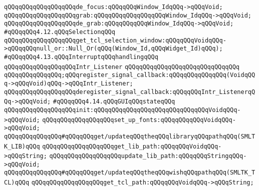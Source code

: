 \verb|qQQqqQQqqQQqqQQqqQQqde_focus:qQQqqQQqWindow_IdqQQq->qQQqVoid;|\newline
\verb|qQQqqQQqqQQqqQQqqQQqgrab:qQQqqQQqqQQqqQQqqQQqWindow_IdqQQq->qQQqVoid;|\newline
\verb|qQQqqQQqqQQqqQQqqQQqde_grab:qQQqqQQqqQQqWindow_IdqQQq->qQQqVoid;|\newline
\newline
\verb|#qQQqqQQq4.12.qQQqSelectionqQQq|\newline
\newline
\verb|qQQqqQQqqQQqqQQqqQQqget_tcl_selection_window:qQQqqQQqVoidqQQq->qQQqqQQqnull_or::Null_Or(qQQq(Window_Id,qQQqWidget_Id)qQQq);|\newline
\newline
\newline
\verb|#qQQqqQQq4.13.qQQqInterruptqQQqhandlingqQQq|\newline
\newline
\verb|qQQqqQQqqQQqqQQqqQQqIntr_Listener|\newline
\verb|qQQqqQQqqQQqqQQqqQQqqQQqqQQqqQQq|\newline
\verb|qQQqqQQqqQQqqQQq;qQQqregister_signal_callback:qQQqqQQqqQQqqQQq(VoidqQQq->qQQqVoid)qQQq->qQQqIntr_Listener;|\newline
\verb|qQQqqQQqqQQqqQQqqQQqderegister_signal_callback:qQQqqQQqIntr_ListenerqQQq->qQQqVoid;|\newline
\newline
\newline
\verb|#qQQqqQQq4.14.qQQqGUIqQQqstateqQQq|\newline
\newline
\verb|qQQqqQQqqQQqqQQqqQQqinit:qQQqqQQqqQQqqQQqqQQqqQQqqQQqqQQqVoidqQQq->qQQqVoid;|\newline
\verb|qQQqqQQqqQQqqQQqqQQqset_up_fonts:qQQqqQQqqQQqVoidqQQq->qQQqVoid;|\newline
\newline
\verb|qQQqqQQqqQQqqQQq#qQQqqQQqget/updateqQQqtheqQQqlibraryqQQqpathqQQq(SMLTK_LIB)qQQq|\newline
\verb|qQQqqQQqqQQqqQQqqQQqget_lib_path:qQQqqQQqVoidqQQq->qQQqString;|\newline
\verb|qQQqqQQqqQQqqQQqqQQqupdate_lib_path:qQQqqQQqStringqQQq->qQQqVoid;|\newline
\newline
\verb|qQQqqQQqqQQqqQQq#qQQqqQQqget/updateqQQqtheqQQqwishqQQqpathqQQq(SMLTK_TCL)qQQq|\newline
\verb|qQQqqQQqqQQqqQQqqQQqget_tcl_path:qQQqqQQqVoidqQQq->qQQqString;|\newline
